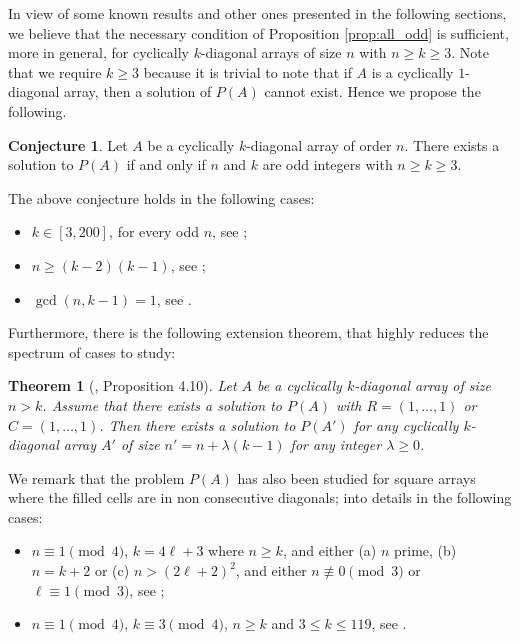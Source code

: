 \documentclass{amsart}
\newtheorem{thm}[prop]{Theorem}
\theoremstyle{definition}
\newtheorem{conjecture}[prop]{Conjecture}
\numberwithin{equation}{section}
\begin{document}
In view of some known results and other ones presented in the following sections, we believe that the necessary condition of Proposition \ref{prop:all_odd} is sufficient, more in general, for cyclically $k$-diagonal arrays of size $n$ with $n\geq k\geq3$. 
Note that we require $k\geq 3$ because it is trivial to note that if $A$ is a cyclically $1$-diagonal array, then a solution of $P(A)$ cannot exist.
Hence we propose the following.
\begin{conjecture} \label{conj:crazy_tour}
Let $A$ be a cyclically $k$-diagonal array of order $n$.
 There exists a solution to $P(A)$ if and only if $n$ and $k$ are odd integers with $n\geq k\geq 3$.
\end{conjecture}
The above conjecture holds in the following cases:
\begin{itemize}
\item $k\in[3,200]$, for every odd $n$, see \cite{CDP};
\item $n\geq(k-2)(k-1)$, see \cite{CDP};
\item $\gcd(n,k-1)=1$, see \cite{CMPP}.
\end{itemize}



Furthermore, there is the following  extension theorem, that highly reduces the spectrum of cases to study:
\begin{thm}[\cite{CDP}, Proposition 4.10]  \label{prop:sol_ext}
Let $A$ be a cyclically $k$-diagonal array of size $n > k$. Assume that there exists a solution to $P (A)$ with $R=(1,\dotsc,1)$ or $C = (1,\dotsc, 1)$. Then there exists a solution to $P (A')$ for any cyclically $k$-diagonal array $A'$ of size $n' = n+ \lambda (k-1)$ for any integer $\lambda \geq 0$.
\end{thm}

We remark that the problem $P(A)$ has also been studied for square arrays where the filled cells are in non consecutive diagonals; into details in the following cases:
\begin{itemize}
\item $n \equiv 1 \pmod{4}$, $k=4\ell+3$ where $n\geq k$, and either (a) $n$ prime, (b) $n=k+2$ or (c) $n>(2\ell+2)^2$, and either $n\not\equiv 0 \pmod{3}$ or $\ell\equiv 1 \pmod{3}$, see \cite{CDY};
    \item $n \equiv 1 \pmod{4}$, $k\equiv 3 \pmod{4}$, $n\geq k$ and $3 \leq k \leq 119$, see \cite{CPP}.
\end{itemize}

 
\end{document}
